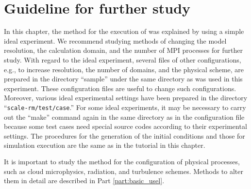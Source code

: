 \section{Guideline for further study} \label{sec:ideal_exp_last}

In this chapter,
the method for the execution of \scalerm was explained by using a simple ideal experiment. We recommend studying methods of changing the model resolution, the calculation domain, and the number of MPI processes for further study.  With regard to the ideal experiment, several files of other configurations,  e.g., to increase resolution, the number of domains, and the physical scheme, are prepared in the directory ``sample'' under the same directory as was used in this experiment.  These configuration files are useful to change such configurations.  Moreover, various ideal experimental settings  have been prepared in the directory ``\verb|scale-rm/test/case|.'' For some ideal experiments,  it may be necessary to carry out the ``make'' command again in the same directory as in the configuration file  because some test cases need special source codes according to their experimental settings. The procedures for the generation of the initial conditions and those for simulation execution are the same as in the tutorial in this chapter.

It is important to study the method for the configuration of physical processes, such as cloud microphysics, radiation, and turbulence schemes. Methods to alter them in detail are described in Part \ref{part:basic_usel}.

